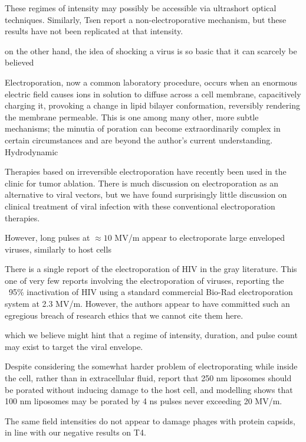 \documentclass[fleqn,10pt]{paper}
\begin{document}
These regimes of intensity may possibly be accessible via ultrashort optical techniques. Similarly, Tsen \cite{Studies2014} report a non-electroporative mechanism, but these results have not been replicated at that intensity\cite{No2011}. 

on the other hand, the idea of shocking a virus is so basic that it can scarcely be believed 


Electroporation\cite{Electroporation1988}, now a common laboratory procedure, occurs when an enormous electric field causes ions in solution to diffuse across a cell membrane, capacitively charging it, provoking a change in lipid bilayer conformation\cite{Membrane2016}, reversibly rendering the membrane permeable. This is one among many other, more subtle mechanisms; the minutia of poration can become extraordinarily complex in certain circumstances and are beyond the author's current understanding\cite{Theoretical2007}. Hydrodynamic

Therapies based on irreversible electroporation\cite{Nonthermal2013}\cite{Lipid2017} have recently been used in the clinic\cite{Irreversible2013} for tumor ablation. There is much discussion on electroporation as an alternative to viral vectors, but we have found surprisingly little discussion on clinical treatment of viral infection with these conventional electroporation therapies.

However, long pulses at $\approx10$ MV/m appear to electroporate large enveloped viruses, similarly to host cells\cite{AC2017}

There is a single report of the electroporation of HIV in the gray literature. This one of very few reports involving the electroporation of viruses, reporting the ~95\% inactivation of HIV using a standard commercial Bio-Rad electroporation system at 2.3 MV/m. However, the authors appear to have committed such an egregious breach of research ethics that we cannot cite them here.

 which we believe might hint that a regime of intensity, duration, and pulse count may exist to target the viral envelope. 
 
Despite considering the somewhat harder problem of electroporating while inside the cell, rather than in extracellular fluid, \cite{Electroporation2013} report that 250 nm liposomes should be porated without inducing damage to the host cell, and modelling shows that 100 nm liposomes may be porated by 4 ns pulses never exceeding 20 MV/m. 

The same field intensities do not appear to damage phages with protein capsids\cite{Manipulation2013}, in line with our negative results on T4.
\end{document}

